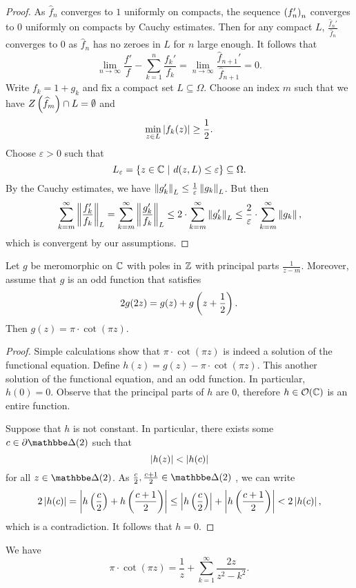 \begin{proof}
As $\widehat{f}_n$ converges to $1$ uniformly on compacts, the
sequence $\left(f_n'\right)_n$ converges to $0$ uniformly on compacts by
Cauchy estimates. Then for any compact $L$,
$\frac{\widehat{f}_n'}{\widehat{f}_n}$ converges to $0$ as
$\widehat{f}_n$ has no zeroes in $L$ for $n$ large enough. It
follows that
\[
\lim_{n \to \infty} \frac{f'}{f} - \sum_{k=1}^n \frac{f_k'}{f_k} =
\lim_{n \to \infty} \frac{\widehat{f}_{n+1}'}{\widehat{f}_{n+1}} =
0.
\]
Write $f_k = 1 + g_k$ and fix a compact set $L \subseteq \Omega$.
Choose an index $m$ such that we have
$Z \left(\widehat{f}_m\right) \cap L = \emptyset$ and
\[
\min_{z \in L} \left\lvert f_k(z)\right\rvert \geq \frac{1}{2}.
\]
Choose $\varepsilon > 0$ such that
\[
L_\varepsilon =
\left\{z \in \mathbb{C}~\middle\vert~d(z, L) \leq \varepsilon\right\} \subseteq
\Omega.
\]
By the Cauchy estimates, we have
$\left\lVert g_k'\right\rVert_L \leq \frac{1}{\varepsilon} \left\lVert g_k\right\rVert_L$. But then
\[
\sum_{k=m}^\infty \left\lVert \frac{f_k'}{f_k}\right\rVert_L =
\sum_{k=m}^\infty \left\lVert \frac{g_k'}{f_k}\right\rVert_L \leq
2 \cdot \sum_{k=m}^\infty \left\lVert g_k'\right\rVert_L \leq
\frac{2}{\varepsilon} \cdot \sum_{k=m}^\infty \left\lVert g_k\right\rVert,
\]
which is convergent by our assumptions.
\end{proof}

\begin{lema}
Let $g$ be meromorphic on $\mathbb{C}$ with poles in $\mathbb{Z}$ with principal
parts $\frac{1}{z-m}$. Moreover, assume that $g$ is an odd
function that satisfies
\[
2 g(2z) = g(z) + g \left(z + \frac{1}{2}\right).
\]
Then $g(z) = \pi \cdot \cot(\pi z)$.
\end{lema}

\begin{proof}
Simple calculations show that $\pi \cdot \cot(\pi z)$ is indeed a
solution of the functional equation. Define
$h(z) = g(z) - \pi \cdot \cot(\pi z)$. This another solution of the
functional equation, and an odd function. In particular,
$h(0) = 0$. Observe that the principal parts of $h$ are $0$,
therefore $h \in \mathcal{O}(\mathbb{C})$ is an entire function.

Suppose that $h$ is not constant. In particular, there exists some
$c \in \partial \dsk(2)$ such that
\[
\left\lvert h(z)\right\rvert < \left\lvert h(c)\right\rvert
\]
for all $z \in \dsk(2)$. As
$\frac{c}{2}, \frac{c+1}{2} \in \dsk(2)$ , we can write
\[
2 \left\lvert h(c)\right\rvert =
\left\lvert h \left(\frac{c}{2}\right) + h \left(\frac{c+1}{2}\right)\right\rvert \leq
\left\lvert h \left(\frac{c}{2}\right)\right\rvert + \left\lvert h \left(\frac{c+1}{2}\right)\right\rvert <
2 \left\lvert h(c)\right\rvert,
\]
which is a contradiction. It follows that $h = 0$.
\end{proof}

\begin{posledica}
We have
\[
\pi \cdot \cot(\pi z) =
\frac{1}{z} + \sum_{k=1}^\infty \frac{2z}{z^2 - k^2}.
\]
\end{posledica}

